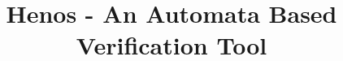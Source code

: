 \documentclass[sigconf,review, anonymous]{acmart}
\begin{document}

\title{Henos - An Automata Based Verification Tool}


\author{
%
}



\begin{abstract}

\end{abstract}

\maketitle







%
% 
%

%
\end{document}
